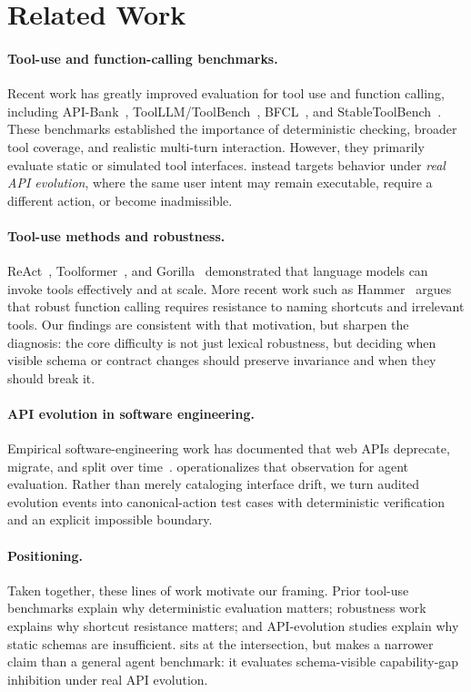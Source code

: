 \section{Related Work}
\label{sec:related}

\paragraph{Tool-use and function-calling benchmarks.}
Recent work has greatly improved evaluation for tool use and function calling, including API-Bank~\citep{li2023apibank}, ToolLLM/ToolBench~\citep{qin2023toolllm}, BFCL~\citep{patil2025bfcl}, and StableToolBench~\citep{guo2024stabletoolbench}. These benchmarks established the importance of deterministic checking, broader tool coverage, and realistic multi-turn interaction. However, they primarily evaluate static or simulated tool interfaces. \toolshift{} instead targets behavior under \emph{real API evolution}, where the same user intent may remain executable, require a different action, or become inadmissible.

\paragraph{Tool-use methods and robustness.}
ReAct~\citep{yao2023react}, Toolformer~\citep{schick2023toolformer}, and Gorilla~\citep{patil2023gorilla} demonstrated that language models can invoke tools effectively and at scale. More recent work such as Hammer~\citep{lin2025hammer} argues that robust function calling requires resistance to naming shortcuts and irrelevant tools. Our findings are consistent with that motivation, but sharpen the diagnosis: the core difficulty is not just lexical robustness, but deciding when visible schema or contract changes should preserve invariance and when they should break it.

\paragraph{API evolution in software engineering.}
Empirical software-engineering work has documented that web APIs deprecate, migrate, and split over time~\citep{yasmin2020restdeprecation}. \toolshift{} operationalizes that observation for agent evaluation. Rather than merely cataloging interface drift, we turn audited evolution events into canonical-action test cases with deterministic verification and an explicit impossible boundary.

\paragraph{Positioning.}
Taken together, these lines of work motivate our framing. Prior tool-use benchmarks explain why deterministic evaluation matters; robustness work explains why shortcut resistance matters; and API-evolution studies explain why static schemas are insufficient. \toolshift{} sits at the intersection, but makes a narrower claim than a general agent benchmark: it evaluates schema-visible capability-gap inhibition under real API evolution.
